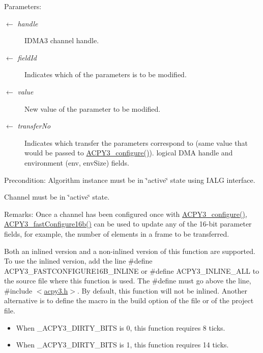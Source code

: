 \begin{Desc}
\item[Parameters:]
\begin{description}
\item[\mbox{$\leftarrow$} {\em handle}]IDMA3 channel handle. \item[\mbox{$\leftarrow$} {\em field\-Id}]Indicates which of the parameters is to be modified. \item[\mbox{$\leftarrow$} {\em value}]New value of the parameter to be modified. \item[\mbox{$\leftarrow$} {\em transfer\-No}]Indicates which transfer the parameters correspond to (same value that would be passed to \hyperlink{group___d_s_p_a_c_p_y3_g427e8e4fd5c445b2f9bb5d971c06c099}{ACPY3\_\-configure()}). logical DMA handle and environment (env, env\-Size) fields.\end{description}
\end{Desc}
\begin{Desc}
\item[Precondition:]Algorithm instance must be in \char`\"{}active\char`\"{} state using IALG interface.

Channel must be in \char`\"{}active\char`\"{} state.\end{Desc}
\begin{Desc}
\item[Remarks:]Once a channel has been configured once with \hyperlink{group___d_s_p_a_c_p_y3_g427e8e4fd5c445b2f9bb5d971c06c099}{ACPY3\_\-configure()}, \hyperlink{group___d_s_p_a_c_p_y3_g2c54ca4dc3d0cf3f861259bc7cf0f8de}{ACPY3\_\-fast\-Configure16b()} can be used to update any of the 16-bit parameter fields, for example, the number of elements in a frame to be transferred.

Both an inlined version and a non-inlined version of this function are supported. To use the inlined version, add the line \#define ACPY3\_\-FASTCONFIGURE16B\_\-INLINE or \#define ACPY3\_\-INLINE\_\-ALL to the source file where this function is used. The \#define must go above the line, \#include $<$\hyperlink{acpy3_8h}{acpy3.h}$>$. By default, this function will not be inlined. Another alternative is to define the macro in the build option of the file or of the project file.

\begin{itemize}
\item When \_\-ACPY3\_\-DIRTY\_\-BITS is 0, this function requires 8 ticks.\item When \_\-ACPY3\_\-DIRTY\_\-BITS is 1, this function requires 14 ticks. \end{itemize}
\end{Desc}
